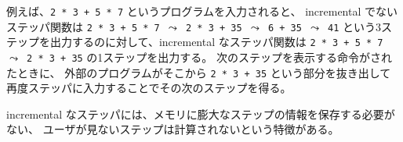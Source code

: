 例えば、\texttt{2 * 3 + 5 * 7} というプログラムを入力されると、
incremental でないステッパ関数は
\texttt{2 * 3 + 5 * 7 $\leadsto$ 2 * 3 + 35 $\leadsto$ 6 + 35 $\leadsto$ 41}
という3ステップを出力するのに対して、incremental なステッパ関数は
\texttt{2 * 3 + 5 * 7 $\leadsto$ 2 * 3 + 35}
の1ステップを出力する。
次のステップを表示する命令がされたときに、
外部のプログラムがそこから \texttt{2 * 3 + 35}
という部分を抜き出して再度ステッパに入力することでその次のステップを得る。

incremental なステッパには、メモリに膨大なステップの情報を保存する必要がない、
ユーザが見ないステップは計算されないという特徴がある。

